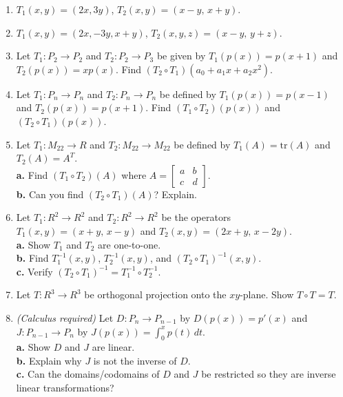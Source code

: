 \documentclass{article}
\begin{document}
\begin{enumerate}
  \item[23.] $T_1(x,y) = (2x,3y)$, $T_2(x,y) = (x-y,\,x+y)$.

  \item[24.] $T_1(x,y) = (2x,-3y,x+y)$, $T_2(x,y,z) = (x-y,\,y+z)$.

  \item[25.] Let $T_1 : P_2 \to P_2$ and $T_2 : P_2 \to P_3$ be given by
        $T_1(p(x)) = p(x+1)$ and $T_2(p(x)) = xp(x)$.
        Find $(T_2\circ T_1)(a_0+a_1x+a_2x^2)$.

  \item[26.] Let $T_1 : P_n \to P_n$ and $T_2 : P_n \to P_n$ be defined by
        $T_1(p(x)) = p(x-1)$ and $T_2(p(x)) = p(x+1)$.
        Find $(T_1\circ T_2)(p(x))$ and $(T_2\circ T_1)(p(x))$.

  \item[27.] Let $T_1 : M_{22} \to R$ and $T_2 : M_{22} \to M_{22}$ be defined by
        $T_1(A) = \mathrm{tr}(A)$ and $T_2(A) = A^T$.\\
        \textbf{a.} Find $(T_1\circ T_2)(A)$ where $A = \begin{bmatrix}a&b\\c&d\end{bmatrix}$.\\
        \textbf{b.} Can you find $(T_2\circ T_1)(A)$? Explain.

  \item[32.] Let $T_1 : R^2 \to R^2$ and $T_2 : R^2 \to R^2$ be the operators
        $T_1(x,y)=(x+y,\,x-y)$ and $T_2(x,y)=(2x+y,\,x-2y)$.\\
        \textbf{a.} Show $T_1$ and $T_2$ are one-to-one.\\
        \textbf{b.} Find $T_1^{-1}(x,y)$, $T_2^{-1}(x,y)$, and $(T_2\circ T_1)^{-1}(x,y)$.\\
        \textbf{c.} Verify $(T_2\circ T_1)^{-1} = T_1^{-1}\circ T_2^{-1}$.

  \item[35.] Let $T : R^3 \to R^3$ be orthogonal projection onto the $xy$-plane.
        Show $T\circ T = T$.

  \item[38.] \textit{(Calculus required)} Let $D : P_n \to P_{n-1}$ by $D(p(x)) = p'(x)$
        and $J : P_{n-1} \to P_n$ by $J(p(x)) = \displaystyle\int_0^x p(t)\,dt$.\\
        \textbf{a.} Show $D$ and $J$ are linear.\\
        \textbf{b.} Explain why $J$ is not the inverse of $D$.\\
        \textbf{c.} Can the domains/codomains of $D$ and $J$ be restricted so they are
        inverse linear transformations?

\end{enumerate}
\end{document}
